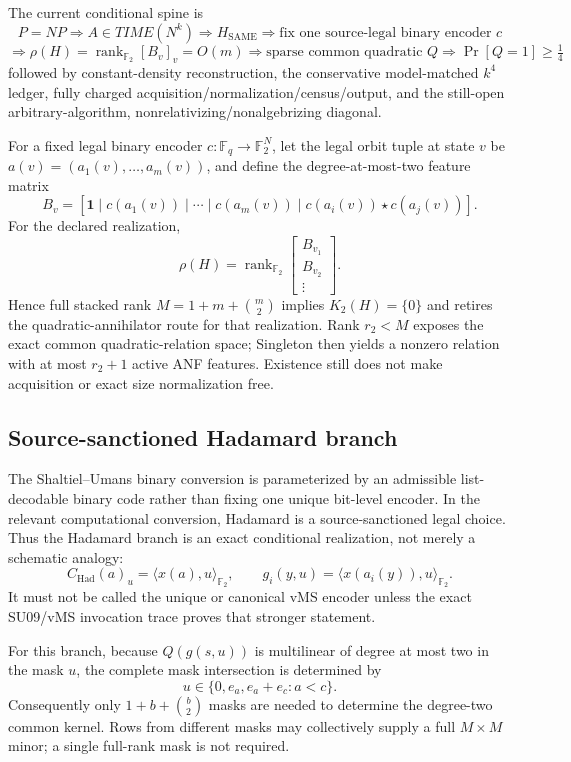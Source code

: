 \documentclass[11pt]{article}
\begin{document}
The current conditional spine is
\[
 P=NP
 \Longrightarrow A\in TIME(N^k)
 \Longrightarrow H_{\mathrm{SAME}}
 \Longrightarrow
 \boxed{\text{fix one source-legal binary encoder }c}
\]
\[
 \Longrightarrow
 \boxed{\rho(H)=\operatorname{rank}_{\mathbb F_2}[B_v]_v=O(m)}
 \Longrightarrow
 \text{sparse common quadratic }Q
 \Longrightarrow
 \Pr[Q=1]\ge \tfrac14
\]
followed by constant-density reconstruction, the conservative model-matched
\(k^4\) ledger, fully charged acquisition/normalization/census/output, and the
still-open arbitrary-algorithm, nonrelativizing/nonalgebrizing diagonal.

For a fixed legal binary encoder \(c:\mathbb F_q\to\mathbb F_2^N\), let the legal
orbit tuple at state \(v\) be \(a(v)=(a_1(v),\ldots,a_m(v))\), and define the
degree-at-most-two feature matrix
\[
 B_v=
 \left[
 \mathbf 1\mid
 c(a_1(v))\mid\cdots\mid c(a_m(v))
 \mid
 c(a_i(v))\star c(a_j(v))
 \right].
\]
For the declared realization,
\[
 \boxed{\rho(H)=\operatorname{rank}_{\mathbb F_2}
 \begin{bmatrix}B_{v_1}\\B_{v_2}\\\vdots\end{bmatrix}}.
\]
Hence full stacked rank \(M=1+m+\binom m2\) implies
\(K_2(H)=\{0\}\) and retires the quadratic-annihilator route for that
realization.  Rank \(r_2<M\) exposes the exact common quadratic-relation
space; Singleton then yields a nonzero relation with at most \(r_2+1\)
active ANF features.  Existence still does not make acquisition or exact
size normalization free.

\subsection{Source-sanctioned Hadamard branch}

The Shaltiel--Umans binary conversion is parameterized by an admissible
list-decodable binary code rather than fixing one unique bit-level encoder.
In the relevant computational conversion, Hadamard is a source-sanctioned
legal choice.  Thus the Hadamard branch is an exact conditional realization,
not merely a schematic analogy:
\[
 C_{\mathrm{Had}}(a)_u=\langle x(a),u\rangle_{\mathbb F_2},
 \qquad
 g_i(y,u)=\langle x(a_i(y)),u\rangle_{\mathbb F_2}.
\]
It must not be called the unique or canonical vMS encoder unless the exact
SU09/vMS invocation trace proves that stronger statement.

For this branch, because \(Q(g(s,u))\) is multilinear of degree at most two
in the mask \(u\), the complete mask intersection is determined by
\[
 u\in\{0,e_a,e_a+e_c:a<c\}.
\]
Consequently only \(1+b+\binom b2\) masks are needed to determine the
degree-two common kernel.  Rows from different masks may collectively
supply a full \(M\times M\) minor; a single full-rank mask is not required.
\end{document}
